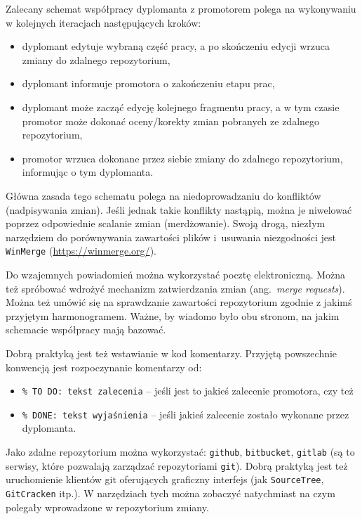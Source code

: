 Zalecany schemat współpracy dyplomanta z promotorem polega na wykonywaniu w kolejnych iteracjach następujących kroków:
\begin{itemize}
\item dyplomant edytuje wybraną część pracy, a po skończeniu edycji wrzuca zmiany do zdalnego repozytorium,
\item dyplomant informuje promotora o zakończeniu etapu prac,
\item dyplomant może zacząć edycję kolejnego fragmentu pracy, a w tym czasie promotor może dokonać oceny/korekty zmian pobranych ze zdalnego repozytorium,
\item promotor wrzuca dokonane przez siebie zmiany do zdalnego repozytorium, informując o tym dyplomanta.
\end{itemize}
Główna zasada tego schematu polega na niedoprowadzaniu do konfliktów (nadpisywania zmian). Jeśli jednak takie konflikty nastąpią, można je niwelować poprzez odpowiednie scalanie zmian (merdżowanie). Swoją drogą, niezłym narzędziem do porównywania zawartości plików i~usuwania niezgodności jest \texttt{WinMerge} (\url{https://winmerge.org/}).


Do wzajemnych powiadomień można wykorzystać pocztę elektroniczną. Można też spróbować wdrożyć mechanizm zatwierdzania zmian (ang.~\emph{merge requests}). Można też umówić się na sprawdzanie zawartości repozytorium zgodnie z jakimś przyjętym harmonogramem. Ważne, by wiadomo było obu stronom, na jakim schemacie współpracy mają bazować.

Dobrą praktyką jest też wstawianie w kod komentarzy. Przyjętą powszechnie konwencją jest rozpoczynanie komentarzy od:
\begin{itemize}
\item \verb|% TO DO: tekst zalecenia| 
-- jeśli jest to jakieś zalecenie promotora, czy też 
\item \verb|% DONE: tekst wyjaśnienia| 
-- jeśli jakieś zalecenie zostało wykonane przez dyplomanta. 
\end{itemize}

Jako zdalne repozytorium można wykorzystać: \texttt{github}, \texttt{bitbucket}, \texttt{gitlab} (są to serwisy, które pozwalają zarządzać repozytoriami \texttt{git}).
Dobrą praktyką jest też uruchomienie klientów git oferujących graficzny interfejs (jak \texttt{SourceTree}, \texttt{GitCracken} itp.). W narzędziach tych można zobaczyć natychmiast na czym polegały wprowadzone w repozytorium zmiany. 
